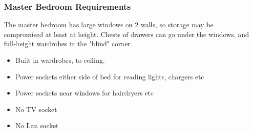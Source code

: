 \subsubsection{Master Bedroom Requirements}
The master bedroom has large windows on 2 walls, so storage may be compromised at least at height. Chests of drawers can go under the windows, and full-height wardrobes in the "blind" corner.

\begin{itemize}
\item Built in wardrobes, to ceiling.
\item Power sockets either side of bed for reading lights, chargers etc
\item Power sockets near windows for hairdryers etc
\item No TV socket
\item No Lan socket

\end{itemize}
